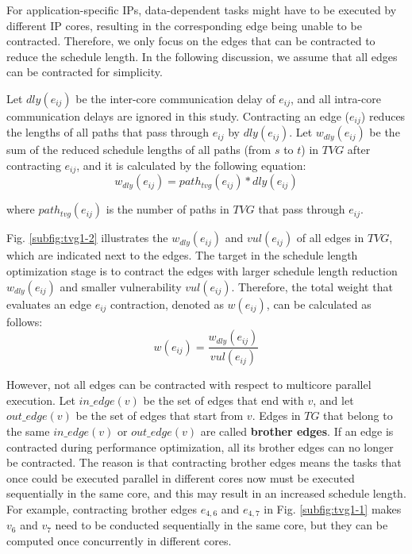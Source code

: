 \documentclass[10pt,journal, compsoc]{IEEEtran}
\begin{document}
For application-specific IPs, data-dependent tasks might have to be executed by different IP cores, resulting in the corresponding edge being unable to be contracted. Therefore, we only focus on the edges that can be contracted to reduce the schedule length. In the following discussion, we assume that all edges can be contracted for simplicity.

Let $dly(e_{ij})$ be the inter-core communication delay of $e_{ij}$, and all intra-core communication delays are ignored in this study. Contracting an edge ($e_{ij}$) reduces the lengths of all paths that pass through $e_{ij}$ by $dly(e_{ij})$. Let $w_{dly}(e_{ij})$ be the sum of the reduced schedule lengths of all paths (from $s$ to $t$) in $TVG$ after contracting $e_{ij}$, and it is calculated by the following equation:
\begin{equation}
w_{dly}(e_{ij})=path_{tvg}(e_{ij})*dly(e_{ij})
\end{equation}


\noindent where $path_{tvg}(e_{ij})$ is the number of paths in $TVG$ that pass through $e_{ij}$.



Fig. \ref{subfig:tvg1-2} illustrates the $w_{dly}(e_{ij})$ and $vul(e_{ij})$ of all edges in $TVG$, which are indicated next to the edges. The target in the schedule length optimization stage is to contract the edges with larger schedule length reduction $w_{dly}(e_{ij})$ and smaller vulnerability $vul(e_{ij})$. Therefore, the total weight that evaluates an edge $e_{ij}$ contraction, denoted as $w(e_{ij})$, can be calculated as follows:
\begin{equation}
w(e_{ij}) = \frac{w_{dly}(e_{ij})}{vul(e_{ij})}
\label{equ:weight_e}
\end{equation}



However, not all edges can be contracted with respect to multicore parallel execution. Let $in\_edge(v)$ be the set of edges that end with $v$, and let $out\_edge(v)$ be the set of edges that start from $v$. Edges in $TG$ that belong to the same $in\_edge(v)$ or $out\_edge(v)$ are called \textbf{brother edges}. If an edge is contracted during performance optimization, all its brother edges can no longer be contracted. The reason is that contracting brother edges means the tasks that once could be executed parallel in different cores now must be executed sequentially in the same core, and this may result in an increased schedule length. For example, contracting brother edges $e_{4,6}$ and $e_{4,7}$ in Fig. \ref{subfig:tvg1-1} makes $v_6$ and $v_7$ need to be conducted sequentially in the same core, but they can be computed once concurrently in different cores.
\end{document}
